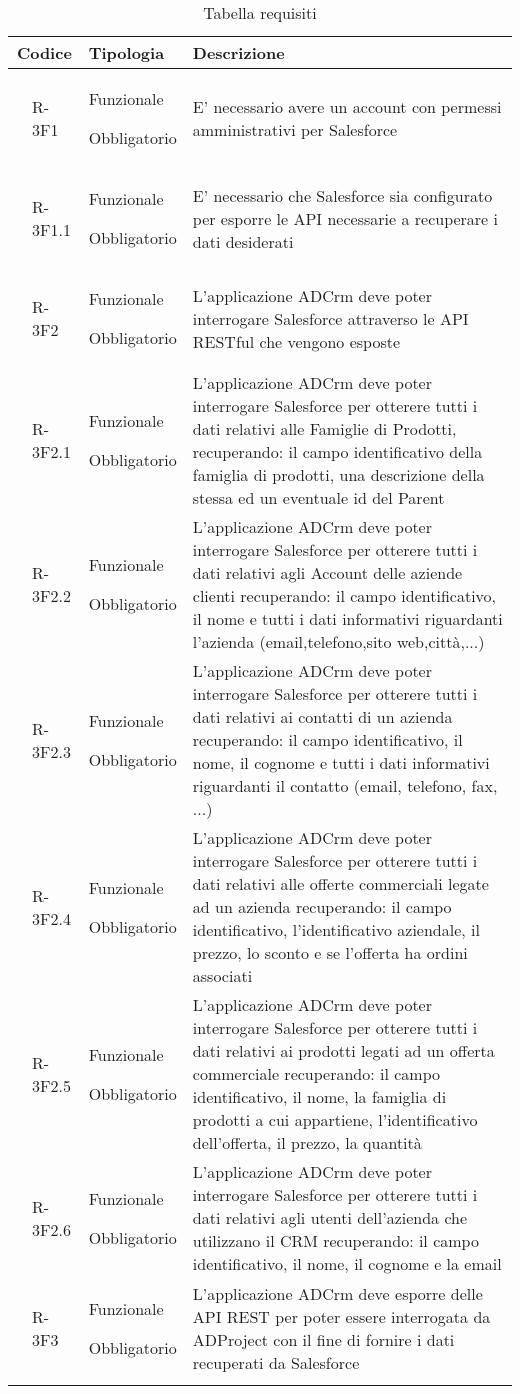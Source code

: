\begin{longtable}{|r l|p{2.5cm}|p{10cm}|}
	\hline
	\multicolumn{2}{|c|}{\textbf{Codice}} & \textbf{Tipologia} & \textbf{Descrizione}\tabularnewline
	\hline
	& \hypertarget{R-3F1}{R-3F1} & Funzionale
	
	Obbligatorio & E' necessario avere un account con permessi amministrativi per Salesforce\tabularnewline
	\hline
	 & R-3F1.1 & Funzionale
	
	Obbligatorio & E' necessario che Salesforce sia configurato per esporre le API necessarie a recuperare i dati desiderati\tabularnewline
	\hline
	& \hypertarget{R-3F2}{R-3F2} & Funzionale
	
	Obbligatorio & L'applicazione ADCrm deve poter interrogare Salesforce attraverso le API RESTful che vengono esposte
	\tabularnewline
	\hline
	& R-3F2.1 & Funzionale
	
	Obbligatorio & L'applicazione ADCrm deve poter interrogare Salesforce per otterere tutti i dati relativi alle Famiglie di Prodotti, recuperando: il campo identificativo della famiglia di prodotti, una descrizione della stessa ed un eventuale id del Parent\tabularnewline
	\hline
	 & R-3F2.2 & Funzionale
	
	Obbligatorio & L'applicazione ADCrm deve poter interrogare Salesforce per otterere tutti i dati relativi agli Account delle aziende clienti recuperando: il campo identificativo, il nome e tutti i dati informativi riguardanti l'azienda (email,telefono,sito web,città,...)\tabularnewline
	\hline
	& R-3F2.3 & Funzionale
	
	Obbligatorio & L'applicazione ADCrm deve poter interrogare Salesforce per otterere tutti i dati relativi ai contatti di un azienda recuperando: il campo identificativo, il nome, il cognome e tutti i dati informativi riguardanti il contatto (email, telefono, fax, ...)\tabularnewline
	\hline
	& R-3F2.4 & Funzionale
	
	Obbligatorio & L'applicazione ADCrm deve poter interrogare Salesforce per otterere tutti i dati relativi alle offerte commerciali legate ad un azienda recuperando: il campo identificativo, l'identificativo aziendale, il prezzo, lo sconto e se l'offerta ha ordini associati \tabularnewline
	\hline
	& R-3F2.5 & Funzionale
	
	Obbligatorio & L'applicazione ADCrm deve poter interrogare Salesforce per otterere tutti i dati relativi ai prodotti legati ad un offerta commerciale recuperando: il campo identificativo, il nome, la famiglia di prodotti a cui appartiene, l'identificativo dell'offerta, il prezzo, la quantità\tabularnewline
	\hline
	& R-3F2.6 & Funzionale
	
	Obbligatorio & L'applicazione ADCrm deve poter interrogare Salesforce per otterere tutti i dati relativi agli utenti dell'azienda che utilizzano il CRM recuperando: il campo identificativo, il nome, il cognome e la email\tabularnewline
	\hline
	& R-3F3 & Funzionale
	
	Obbligatorio & L'applicazione ADCrm deve esporre delle API REST per poter essere interrogata da ADProject con il fine di fornire i dati recuperati da Salesforce\tabularnewline
	\hline
	\caption{Tabella requisiti} 
	\tabularnewline
\end{longtable}
